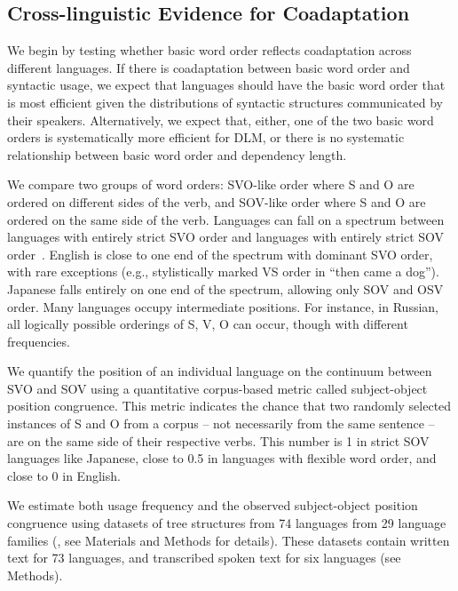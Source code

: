 \documentclass[9pt,twocolumn,twoside,lineno]{pnas-new}
\begin{document}
\subsection*{Cross-linguistic Evidence for Coadaptation}

We begin by testing whether basic word order reflects coadaptation across different languages.
If there is coadaptation between basic word order and syntactic usage, we expect that languages should have the basic word order that is most efficient given the distributions of syntactic structures communicated by their speakers.
Alternatively, we expect that, either, one of the two basic word orders is systematically more efficient for DLM, or there is no systematic relationship between basic word order and dependency length.


We compare two groups of word orders: SVO-like order where S and O are ordered on different sides of the verb, and SOV-like order where S and O are ordered on the same side of the verb.
Languages can fall on a spectrum between languages with entirely strict SVO order and languages with entirely strict SOV order~\citep{steele1978word}.
English is close to one end of the spectrum with dominant SVO order, with rare exceptions (e.g., stylistically marked VS order in ``then came a dog'').
Japanese falls entirely on one end of the spectrum, allowing only SOV and OSV order.
Many languages occupy intermediate positions. 
For instance, in Russian, all logically possible orderings of S, V, O can occur, though with different frequencies.


We quantify the position of an individual language on the continuum between SVO and SOV using a quantitative corpus-based metric called subject-object position congruence.
This metric indicates the chance that two randomly selected instances of S and O from a corpus -- not necessarily from the same sentence -- are on the same side of their respective verbs. This number is 1 in strict SOV languages like Japanese, close to 0.5 in languages with flexible word order, and close to 0 in English.


We estimate both usage frequency and the observed subject-object position congruence using datasets of tree structures from 74 languages from 29 language families (\citep{zeman2020universal}, see Materials and Methods for details).
These datasets contain written text for 73 languages, and transcribed spoken text for six languages (see Methods).
\end{document}
